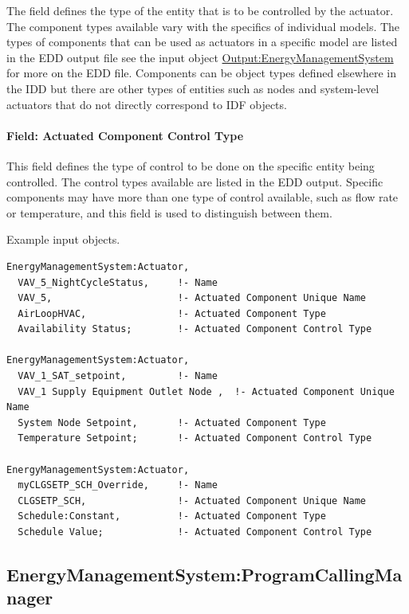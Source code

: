 The field defines the type of the entity that is to be controlled by the actuator. The component types available vary with the specifics of individual models. The types of components that can be used as actuators in a specific model are listed in the EDD output file see the input object \hyperref[outputenergymanagementsystem]{Output:EnergyManagementSystem} for more on the EDD file. Components can be object types defined elsewhere in the IDD but there are other types of entities such as nodes and system-level actuators that do not directly correspond to IDF objects.

\paragraph{Field: Actuated Component Control Type}\label{field-actuated-component-control-type}

This field defines the type of control to be done on the specific entity being controlled. The control types available are listed in the EDD output. Specific components may have more than one type of control available, such as flow rate or temperature, and this field is used to distinguish between them.

Example input objects.

\begin{lstlisting}
EnergyManagementSystem:Actuator,
  VAV_5_NightCycleStatus,     !- Name
  VAV_5,                      !- Actuated Component Unique Name
  AirLoopHVAC,                !- Actuated Component Type
  Availability Status;        !- Actuated Component Control Type

EnergyManagementSystem:Actuator,
  VAV_1_SAT_setpoint,         !- Name
  VAV_1 Supply Equipment Outlet Node ,  !- Actuated Component Unique Name
  System Node Setpoint,       !- Actuated Component Type
  Temperature Setpoint;       !- Actuated Component Control Type

EnergyManagementSystem:Actuator,
  myCLGSETP_SCH_Override,     !- Name
  CLGSETP_SCH,                !- Actuated Component Unique Name
  Schedule:Constant,          !- Actuated Component Type
  Schedule Value;             !- Actuated Component Control Type
\end{lstlisting}

\subsection{EnergyManagementSystem:ProgramCallingManager}\label{energymanagementsystemprogramcallingmanager}

